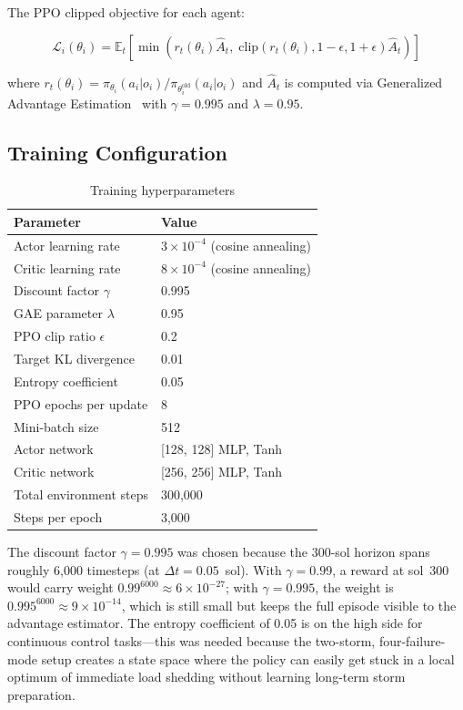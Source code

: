 \documentclass[11pt,a4paper]{article}
\begin{document}
The PPO clipped objective for each agent:

\begin{equation}\label{eq:ppo}
  \mathcal{L}_i(\theta_i) = \mathbb{E}_t\left[\min\left(r_t(\theta_i)\hat{A}_t,\; \text{clip}(r_t(\theta_i), 1-\epsilon, 1+\epsilon)\hat{A}_t\right)\right]
\end{equation}

where $r_t(\theta_i) = \pi_{\theta_i}(a_i|o_i) / \pi_{\theta_i^{\text{old}}}(a_i|o_i)$ and $\hat{A}_t$ is computed via Generalized Advantage Estimation~\cite{gae} with $\gamma = 0.995$ and $\lambda = 0.95$.

\subsection{Training Configuration}

\begin{table}[H]
  \centering
  \caption{Training hyperparameters}
  \label{tab:hparams}
  \begin{tabular}{@{}ll@{}}
    \toprule
    \textbf{Parameter} & \textbf{Value} \\
    \midrule
    Actor learning rate & $3 \times 10^{-4}$ (cosine annealing) \\
    Critic learning rate & $8 \times 10^{-4}$ (cosine annealing) \\
    Discount factor $\gamma$ & 0.995 \\
    GAE parameter $\lambda$ & 0.95 \\
    PPO clip ratio $\epsilon$ & 0.2 \\
    Target KL divergence & 0.01 \\
    Entropy coefficient & 0.05 \\
    PPO epochs per update & 8 \\
    Mini-batch size & 512 \\
    Actor network & [128, 128] MLP, Tanh \\
    Critic network & [256, 256] MLP, Tanh \\
    Total environment steps & 300,000 \\
    Steps per epoch & 3,000 \\
    \bottomrule
  \end{tabular}
\end{table}

The discount factor $\gamma = 0.995$ was chosen because the 300-sol horizon spans roughly 6,000 timesteps (at $\Delta t = 0.05$~sol). With $\gamma = 0.99$, a reward at sol~300 would carry weight $0.99^{6000} \approx 6 \times 10^{-27}$; with $\gamma = 0.995$, the weight is $0.995^{6000} \approx 9 \times 10^{-14}$, which is still small but keeps the full episode visible to the advantage estimator. The entropy coefficient of 0.05 is on the high side for continuous control tasks---this was needed because the two-storm, four-failure-mode setup creates a state space where the policy can easily get stuck in a local optimum of immediate load shedding without learning long-term storm preparation.
\end{document}
